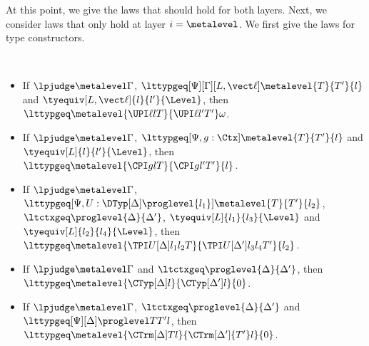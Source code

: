 At this point, we give the laws that should hold for both layers. %
Next, we consider laws that only hold at layer $i = \metalevel$. %
We first give the laws for type constructors.
\begin{law} $ $
  \begin{itemize}
  \item If $\lpjudge \metalevel \Gamma$, $\lttypgeq[\Psi][\Gamma][L, \vect\ell] \metalevel{T}{T'}{l}$
    and $\tyequiv[L,\vect\ell]{l}{l'}{\Level}$, then
    $\lttypgeq \metalevel{\UPI \ell l T}{\UPI \ell{l'}{T'}}\omega$.
  \item If $\lpjudge \metalevel \Gamma$, $\lttypgeq[\Psi, g : \Ctx] \metalevel{T}{T'}{l}$ and
    $\tyequiv[L]{l}{l'}{\Level}$, then \newline
    $\lttypgeq \metalevel{\CPI g l T}{\CPI g{l'}{T'}}{l}$. 
  \item If $\lpjudge \metalevel \Gamma$, $\lttypgeq[\Psi, U : \DTyp[\Delta] \proglevel{l_1}]
    \metalevel{T}{T'}{l_2}$, $\ltctxgeq \proglevel{\Delta}{\Delta'}$, $\tyequiv[L]{l_1}{l_3}{\Level}$
    and $\tyequiv[L]{l_2}{l_4}{\Level}$, then 
    $\lttypgeq \metalevel{\TPI U [\Delta]{l_1}{l_2} T}{\TPI U[\Delta']{l_3}{l_4}{T'}}{l_2}$.
  \item If $\lpjudge \metalevel \Gamma$ and $\ltctxgeq \proglevel{\Delta}{\Delta'}$, then $\lttypgeq
    \metalevel{\CTyp[\Delta]l}{\CTyp[\Delta']l}{0}$.
  \item If $\lpjudge \metalevel \Gamma$, $\ltctxgeq \proglevel{\Delta}{\Delta'}$ and
    $\lttypgeq[\Psi][\Delta]\proglevel T{T'}l$, then \newline
    $\lttypgeq \metalevel{\CTrm[\Delta] Tl}{\CTrm[\Delta']{T'}l}{0}$.
  \end{itemize}
\end{law}

